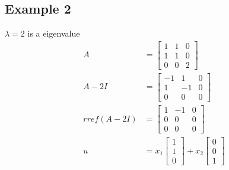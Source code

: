 \documentclass{article}
\theoremstyle{mytheoremstyle}
\theoremstyle{mytheoremstyle}
\theoremstyle{myproblemstyle}
\begin{document}
    \subsection*{Example 2}
    $\lambda=2$ is a eigenvalue
    \begin{align*}
        A &= \begin{bmatrix}
            1 & 1 & 0 \\
            1 & 1 & 0 \\
            0 & 0 & 2
        \end{bmatrix} \\
        A-2I &= \begin{bmatrix}
            -1 & 1 & 0 \\
            1 & -1 & 0 \\
            0 & 0 & 0
        \end{bmatrix} \\
        rref(A-2I) &= \begin{bmatrix}
            1 & -1 & 0 \\
            0 & 0 & 0 \\
            0 & 0 & 0
        \end{bmatrix} \\
        u &= x_1 \begin{bmatrix}
            1 \\ 1 \\ 0
        \end{bmatrix} + x_2 \begin{bmatrix}
            0 \\ 0 \\ 1
        \end{bmatrix}
    \end{align*}
\end{document}
